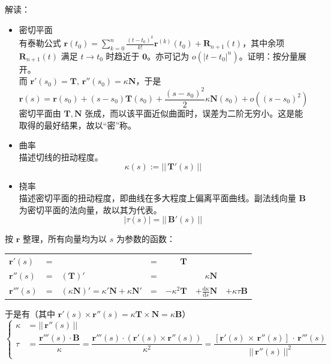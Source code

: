 \documentclass[12pt, a4paper, UTF8, openany]{ctexbook}
\newcommand{\dif}{\mathrm{d}}
\newcommand{\mat}[1]{\mathbf{#1}}
\newcommand{\len}[1]{||\, #1 \,||}%
\begin{document}
        解读：
        \begin{itemize}
            \item 密切平面 \\
                有泰勒公式 $\mat{r}(t_0) = \sum_{k = 0}^{n} \frac{(t - t_0)^k}{k!} \mat{r}^{(k)}(t_0) + \mat{R}_{n + 1}(t)$，其中余项 $\mat{R}_{n + 1}(t)$ 满足 $t \to t_0$ 时趋近于 $\mat{0}$。亦可记为 $o(|t - t_0|^n)$。证明：按分量展开。\\
                而 $\mat{r}'(s_0) = \mat{T}, \, \mat{r}''(s_0) = \kappa\mat{N}$，于是
                $$\mat{r}(s) = \mat{r}(s_0) + (s - s_0)\boxed{\mat{T}(s_0)} + \frac{(s - s_0)^2}{2}\kappa\boxed{\mat{N}(s_0)} + o((s - s_0)^2)$$
                密切平面由 $\mat{T}, \mat{N}$ 张成，而以该平面近似曲面时，误差为二阶无穷小。这是能取得的最好结果，故以“密”称。
            \item 曲率 \\
                描述切线的扭动程度。
                $$\kappa(s) := \len{\mat{T}'(s)}$$
            \item 挠率 \\
                描述密切平面的扭动程度，即曲线在多大程度上偏离平面曲线。副法线向量 $\mat{B}$ 为密切平面的法向量，故以其为代表。
                $$|\tau(s)| = \len{\mat{B}'(s)}$$
        \end{itemize}

        按 $\mat{r}$ 整理，所有向量均为以 $s$ 为参数的函数：
        \begin{longtable}[h]{l l l l r r r}
            $\mat{r}'(s)$ & = & & = & $\mat{T}$ & & \\
            $\mat{r}''(s)$ & = & $(\mat{T})'$ & = & & $\kappa \mat{N}$ & \\
            $\mat{r}'''(s)$ & = & $(\kappa \mat{N})' = \kappa' \mat{N} + \kappa \mat{N}'$ & = & $-\kappa^2 \mat{T}$ & $+ \frac{\dif\kappa}{\dif s} \mat{N}$ & $+\kappa \tau \mat{B}$
        \end{longtable}

        于是有（其中 $\mat{r}'(s) \times \mat{r}''(s) = \kappa \mat{T} \times \mat{N} = \kappa \mat{B}$）
        $$\begin{cases}
            \kappa &= \boxed{\len{\mat{r}''(s)}} \\
            \tau &= \dfrac{\mat{r}'''(s) \cdot \mat{B}}{\kappa} = \dfrac{\mat{r}'''(s) \cdot (\mat{r}'(s) \times \mat{r}''(s))}{\kappa^2} = \boxed{\dfrac{[\mat{r}'(s) \, \times \, \mat{r}''(s)] \, \cdot \, \mat{r}'''(s)}{\len{\mat{r}''(s)}^2}}
        \end{cases}$$
\end{document}
